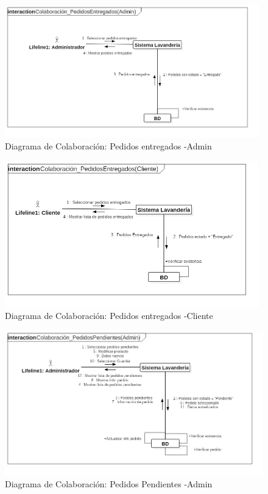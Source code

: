 \newpage
\begin{figure}[htb]
\begin{center}
\includegraphics[width=11cm]{./imagenes/diagramas/Colaboracion_PedidosEntregados(Admin).png}
\end{center}
\caption{Diagrama de Colaboración: Pedidos entregados -Admin}
\end{figure}


\begin{figure}[htb]
\begin{center}
\includegraphics[width=11cm]{./imagenes/diagramas/Colaboracion_PedidosEntregados(Cliente).png}
\end{center}
\caption{Diagrama de Colaboración: Pedidos entregados -Cliente}
\end{figure}

\newpage
\begin{figure}[htb]
\begin{center}
\includegraphics[width=13cm]{./imagenes/diagramas/Colaboracion_PedidosPendientes(Admin).png}
\end{center}
\caption{Diagrama de Colaboración: Pedidos Pendientes -Admin }
\end{figure}

